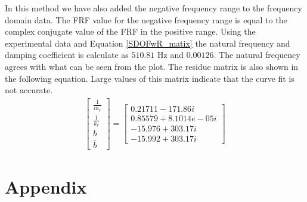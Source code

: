 \documentclass[paper=a4, fontsize=12pt]{scrartcl} %
\begin{document}
%
In this method we have also added the negative frequency range to the frequency domain data. The FRF value for the negative frequency range is equal to the complex conjugate value of the FRF in the positive range. Using the experimental data and Equation \eqref{SDOFwR_matix} the natural frequency and damping coefficient is calculate as $510.81$ Hz and $0.00126$. The natural frequency agrees with what can be seen from the plot. The residue matrix is also shown in the following equation. Large values of this matrix indicate that the curve fit is not accurate.
%
\begin{gather}
\begin{bmatrix}
	\frac{1}{m_r} \\
	\frac{1}{k_r} \\
	b \\
	\bar{b}
\end{bmatrix}
=
\begin{bmatrix}
     0.21711 - 171.86i \\
     0.85579 + 8.1014e-05i \\
     -15.976 + 303.17i \\
     -15.992 + 303.17i
\end{bmatrix}
\end{gather}
%
\newpage
\section*{Appendix}
\end{document}
